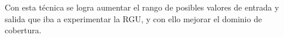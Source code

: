 Con esta técnica se logra aumentar el rango de posibles valores de entrada y salida que iba a experimentar la RGU, y con ello mejorar el dominio de cobertura.

\begin{comment}

\subsection{Modelo MVC}

El patrón de diseño MVC es uno de los más populares para la creación de aplicaciones, tanto de escritorio como web. Esto debido a que permite que los componentes de la arquitectura del software puedan variar de manera casi independiente y aún así seguir proveyendo una correcta funcionalidad a la aplicación. De esta manera, no solo se puede hacer un diseño limpio y fácil de entender y depurar, sino que es más fácil realizar actualizaciones y darles mantenimiento, ya que si algo falla, es bastante evidente cual de los componentes es el que está fallando. Además, el MVC facilita la programación orientada a objetos, paradigma que ya se tiene en HTML5 con los DOM, por lo que es apropiado utilizarlo. \\

Para seguir este patrón las divisiones se realizaron de la siguiente manera:

\begin{enumerate}
\item Los Views están compuestos por los diferentes archivos en el lenguaje HTML5 que le permiten al usuario visualizar en su navegador la aplicación y poder interactuar con la misma.

\item Los Controllers son varios archivos en JavaScript, utilizando el framework AngularJS, que permiten dar funciones específicas a las interacciones que tiene el usuario con los Views. Los controllers envían peticiones HTTP, como los son los POSTs, GETs, PUTs para modificar los contenidos del Model.


\end{comment}
